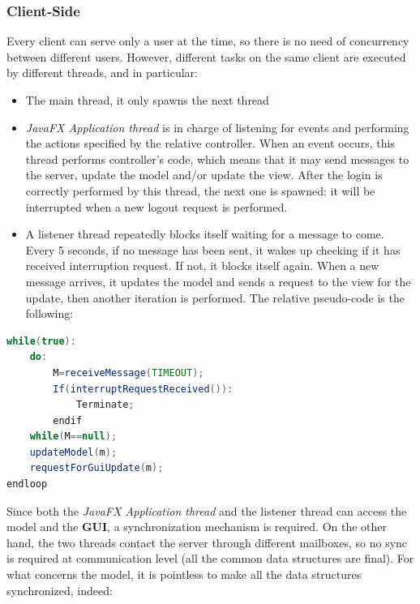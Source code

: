 \subsubsection{Client-Side}
Every client can serve only a user at the time, so there is no need of concurrency between different users. However, different tasks on the same client are executed by different threads, and in particular:
\begin{itemize}
	\item The main thread, it only spawns the next thread
	\item \textit{JavaFX Application thread} is in charge of listening for events and performing the actions specified by the relative controller. When an event occurs, this thread performs controller’s code, which means that it may send messages to the server, update the model and/or update the view. After the login is correctly performed by this thread, the next one is spawned: it will be interrupted when a new logout request is performed.
	\item A listener thread repeatedly blocks itself waiting for a message to come. Every 5 seconds, if no message has been sent, it wakes up checking if it has received interruption request. If not, it blocks itself again. When a new message arrives, it updates the model and sends a request to the view for the update, then another iteration is performed. The relative pseudo-code is the following:
\end{itemize}

\begin{lstlisting}[language=java]
while(true):
	do:
		M=receiveMessage(TIMEOUT);
		If(interruptRequestReceived()):
			Terminate;
		endif
	while(M==null);
	updateModel(m);
	requestForGuiUpdate(m);
endloop
\end{lstlisting}
Since both the  \textit{JavaFX Application thread} and the listener thread can access the model and the \textbf{GUI}, a synchronization mechanism is required. On the other hand, the two threads contact the server through different mailboxes, so no sync is required at communication level (all the common data structures are final).
For what concerns the model, it is pointless to make all the data structures synchronized, indeed:

